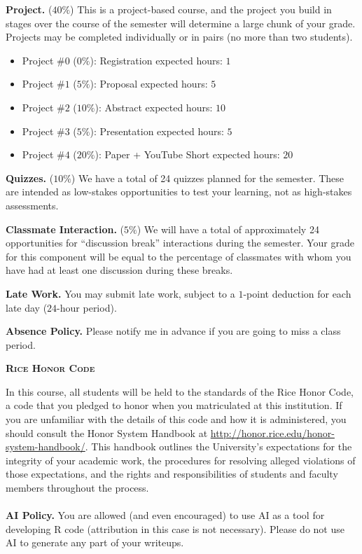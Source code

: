 \documentclass[11pt]{article}
\begin{document}
\begin{adjustwidth}{1cm}{0cm}
  \textbf{Project.} ($40\%$) This is a project-based course, and the project you build in stages over the course of the semester will determine a large chunk of your grade. Projects may be completed individually or in pairs (no more than two students).
  \begin{itemize}
    \item Project \#$0$ ($0\%$): Registration                   \hfill expected hours: $1$
    \item Project \#$1$ ($5\%$): Proposal                       \hfill expected hours: $5$
    \item Project \#$2$ ($10\%$): Abstract                      \hfill expected hours: $10$
    \item Project \#$3$ ($5\%$): Presentation                   \hfill expected hours: $5$
    \item Project \#$4$ ($20\%$): Paper + YouTube Short         \hfill expected hours: $20$
  \end{itemize}

  \textbf{Quizzes.} ($10\%$) We have a total of 24 quizzes planned for the semester. These are intended as low-stakes opportunities to test your learning, not as high-stakes assessments.

  \textbf{Classmate Interaction.} ($5\%$) We will have a total of approximately 24 opportunities for ``discussion break'' interactions during the semester. Your grade for this component will be equal to the percentage of classmates with whom you have had at least one discussion during these breaks.

  \textbf{Late Work.} You may submit late work, subject to a $1$-point deduction for each late day ($24$-hour period).

  \textbf{Absence Policy.} Please notify me in advance if you are going to miss a class period.
\end{adjustwidth}

\newpage
\textbf{\textsc{Rice Honor Code}}
\begin{adjustwidth}{1cm}{0cm}
  In this course, all students will be held to the standards of the Rice Honor Code, a code that you pledged to honor when you matriculated at this institution. If you are unfamiliar with the details of this code and how it is administered, you should consult the Honor System Handbook at \url{http://honor.rice.edu/honor-system-handbook/}. This handbook outlines the University's expectations for the integrity of your academic work, the procedures for resolving alleged violations of those expectations, and the rights and responsibilities of students and faculty members throughout the process.\\
  ~\\
  \textbf{AI Policy.} You are allowed (and even encouraged) to use AI as a tool for developing R code (attribution in this case is not necessary). Please do not use AI to generate any part of your writeups.
\end{adjustwidth}
\end{document}
